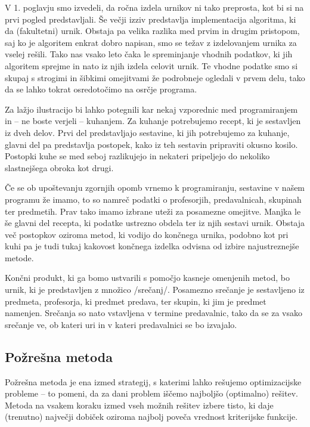 \documentclass[a4paper, 10pt]{article}
\begin{document}
V 1. poglavju smo izvedeli, da ročna izdela urnikov ni tako preprosta, kot bi si
na prvi pogled predstavljali. Še večji izziv predstavlja implementacija algoritma, ki da
(fakultetni) urnik. Obstaja pa velika razlika med prvim in drugim pristopom, saj ko je
algoritem enkrat dobro napisan, smo se težav z izdelovanjem urnika za vselej rešili.
Tako nas vsako leto čaka le spreminjanje vhodnih podatkov, ki jih algoritem sprejme in
nato iz njih izdela celovit urnik. Te vhodne podatke smo si skupaj s strogimi in šibkimi
omejitvami že podrobneje ogledali v prvem delu, tako da se lahko tokrat osredotočimo na
osrčje programa.

Za lažjo ilustracijo bi lahko potegnili kar nekaj vzporednic med programiranjem in -- ne
boste verjeli -- kuhanjem. Za kuhanje potrebujemo recept, ki je sestavljen iz dveh delov.
Prvi del predstavljajo sestavine, ki jih potrebujemo za kuhanje, glavni del pa predstavlja
postopek, kako iz teh sestavin pripraviti okusno kosilo. Postopki kuhe se med seboj
razlikujejo in nekateri pripeljejo do nekoliko slastnejšega obroka kot drugi.

Če se ob upoštevanju zgornjih opomb vrnemo k programiranju, sestavine v našem programu že
imamo, to so namreč podatki o profesorjih, predavalnicah, skupinah ter predmetih. Prav tako
imamo izbrane uteži za posamezne omejitve. Manjka le še glavni del recepta, ki podatke
ustrezno obdela ter iz njih sestavi urnik. Obstaja več postopkov oziroma metod, ki vodijo
do končnega urnika, podobno kot pri kuhi pa je tudi tukaj kakovost končnega izdelka odvisna
od izbire najustreznejše metode.

Končni produkt, ki ga bomo ustvarili s pomočjo kasneje omenjenih metod, bo urnik, ki je
predstavljen z množico /srečanj/. Posamezno srečanje je sestavljeno iz predmeta,
profesorja, ki predmet predava, ter skupin, ki jim je predmet namenjen. Srečanja so nato
vstavljena v termine predavalnic, tako da se za vsako srečanje ve, ob kateri uri in v
kateri predavalnici se bo izvajalo.

\subsection{Požrešna metoda}

Požrešna metoda je ena izmed strategij, s katerimi lahko rešujemo optimizacijske probleme --
to pomeni, da za dani problem iščemo najboljšo (optimalno) rešitev. Metoda na vsakem koraku
izmed vseh možnih rešitev izbere  tisto, ki daje (trenutno) največji dobiček oziroma najbolj
poveča vrednost kriterijske funkcije.
\end{document}
